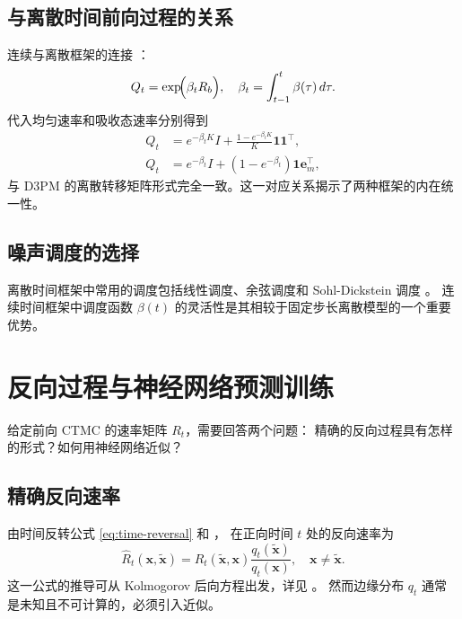 \documentclass[12pt,a4paper]{ctexbook}
\theoremstyle{definition}
\begin{document}
\subsection{与离散时间前向过程的关系}

连续与离散框架的连接 \cite[Appendix A]{austin2021d3pm}\cite[§2.1]{zhao2025ud3}：
\begin{equation}
Q_t = \exp\!\Bigl( \beta_t R_b \Bigr), \quad \beta_t = \int_{t-1}^t \beta(\tau)\, d\tau. \label{eq:disc-conn}
\end{equation}
代入均匀速率和吸收态速率分别得到
\begin{align}
Q_t &= e^{-\beta_t K} I + \frac{1 - e^{-\beta_t K}}{K} \mathbf{1} \mathbf{1}^\top, \label{eq:uniform-disc} \\
Q_t &= e^{-\beta_t} I + (1 - e^{-\beta_t}) \mathbf{1} \mathbf{e}_m^\top, \label{eq:absorbing-disc}
\end{align}
与 D3PM 的离散转移矩阵形式完全一致。这一对应关系揭示了两种框架的内在统一性。

\subsection{噪声调度的选择}

离散时间框架中常用的调度包括线性调度、余弦调度和 Sohl-Dickstein 调度
\cite[§1]{austin2021d3pm}\cite[§4.1]{campbell2022ctmc}。
连续时间框架中调度函数 $\beta(t)$ 的灵活性是其相较于固定步长离散模型的一个重要优势。

\section{反向过程与神经网络预测训练}
\label{sec:reverse}

给定前向 CTMC 的速率矩阵 $R_t$，需要回答两个问题：
精确的反向过程具有怎样的形式？如何用神经网络近似？

\subsection{精确反向速率}

由时间反转公式 \eqref{eq:time-reversal} 和 \cite[§3.1 Proposition 1]{campbell2022ctmc}，
在正向时间 $t$ 处的反向速率为
\begin{equation}
\hat{R}_t(\boldsymbol{x}, \tilde{\boldsymbol{x}}) = R_t(\tilde{\boldsymbol{x}}, \boldsymbol{x}) \frac{q_t(\tilde{\boldsymbol{x}})}{q_t(\boldsymbol{x})}, \quad \boldsymbol{x} \neq \tilde{\boldsymbol{x}}. \label{eq:reverse-exact}
\end{equation}
这一公式的推导可从 Kolmogorov 后向方程出发，详见 \cite[Appendix B.1]{campbell2022ctmc}。
然而边缘分布 $q_t$ 通常是未知且不可计算的，必须引入近似。
\end{document}
